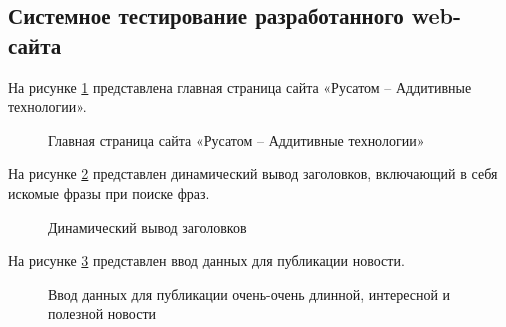 \subsection{Системное тестирование разработанного web-сайта}

На рисунке \ref{main:image} представлена главная страница сайта «Русатом – Аддитивные технологии».
\newpage %
\begin{figure}[H] %
\caption{Главная страница сайта «Русатом – Аддитивные технологии»}
\label{main:image}
\end{figure}

На рисунке \ref{menu:image} представлен динамический вывод заголовков, включающий в себя искомые фразы при поиске фраз.

\begin{figure}[ht]
\caption{Динамический вывод заголовков}
\label{menu:image}
\end{figure}

На рисунке \ref{enter:image} представлен ввод данных для публикации новости.

\begin{figure}[ht]
\caption{Ввод данных для публикации очень-очень длинной, интересной и полезной новости}
\label{enter:image}
\end{figure}
